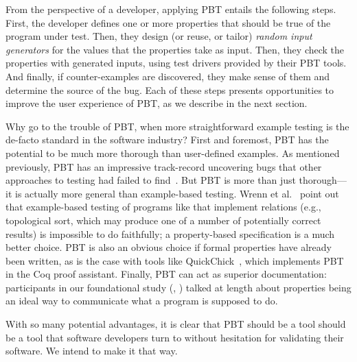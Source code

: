 From the perspective of a developer, applying PBT entails the following
steps. First, the developer defines one or more properties that should be true
of the program under test. Then, they design (or reuse, or tailor) {\em random
input generators} for the values that the properties take as input. Then, they
check the properties with generated inputs, using test drivers provided by their
PBT tools. And finally, if counter-examples are discovered, they make sense of
them and determine the source of the bug.
Each of these steps presents opportunities to improve the user experience of
PBT, as we describe in the next section.

\smallskip

Why go to the trouble of PBT, when more straightforward example testing is the
de-facto standard in the software industry? First and foremost, PBT has the
potential to be much more thorough than user-defined examples. As mentioned
previously, PBT has an impressive track-record uncovering bugs that other
approaches to testing had failed to find~\cite{arts2006testing,
hughes2014mysteries, Bornholt2021, arts2015testing, hughes2016experiences}. But
PBT is more than just thorough---it is actually more general than example-based
testing. Wrenn et al.~\cite{wrenn2021using} point out that example-based testing
of programs like that implement relations (e.g., topological sort, which may
produce one of a number of potentially correct results) is impossible to do
faithfully; a property-based specification is a much better choice. PBT is also
an obvious choice if formal properties have already been written, as is the case 
with tools like QuickChick~\cite{paraskevopoulou_foundational_2015}, which 
implements PBT in
the Coq proof assistant. Finally, PBT can act as superior documentation:
participants in our foundational study (, )
talked at length about properties being an ideal way to communicate what a
program is supposed to do.

With so many potential advantages, it is clear that PBT should be a tool should 
be a tool that software developers turn to without hesitation for validating 
their software. We intend to make it that way.

\iflater{}
  \fi

